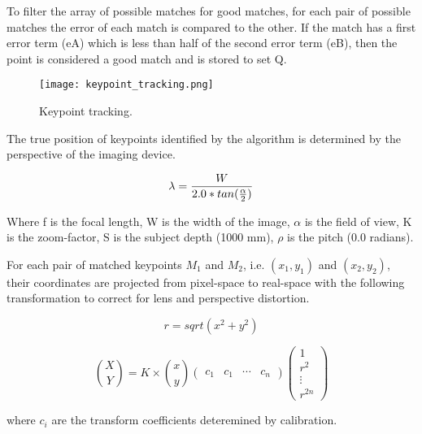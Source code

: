 To filter the array of possible matches for good matches, for each
pair of possible matches the error of each match is compared to the
other. If the match has a first error term (eA) which is less than
half of the second error term (eB), then the point is considered a
good match and is stored to set Q.  

\begin{figure}
  \centering
  \texttt{[image: keypoint\_tracking.png]}
  \caption{Keypoint tracking.}
  \label{fig:keypoint_tracking}
\end{figure}

The true position of keypoints identified by the algorithm is
determined by the perspective of the imaging device. 

\begin{equation}
\centering
\lambda = \frac{W}{2.0 * tan(\frac{\alpha}{2})}
\label{eq:geometric}
\end{equation}
\begin{flushleft}
Where f is the focal length, W is the width of the image, $\alpha$ is
the field of view, K is the zoom-factor, S is the subject depth  (1000
mm), $\rho$ is the pitch
(0.0 radians).
\end{flushleft}

For each pair of matched keypoints $M_{1}$ and $M_{2}$,
i.e. $(x_{1},y_{1})$ and $(x_{2},y_{2})$, their coordinates are
projected from pixel-space to real-space with the following
transformation to correct for lens and perspective distortion.

\begin{equation}
r = sqrt(x^2 + y^2)
\end{equation}

\begin{equation}
\binom{X}{Y} = K \times \binom{x}{y}
\begin{pmatrix}
  c_{1} & c_{1} & \cdots & c_{n}
\end{pmatrix}
\begin{pmatrix}
  1 \\
  r^2 \\
  \vdots \\
  r^{2n}
\end{pmatrix}
\label{eq:undistort}
\end{equation}
\begin{flushleft}
where $c_{i}$ are the transform coefficients deteremined by calibration.
\end{flushleft}

